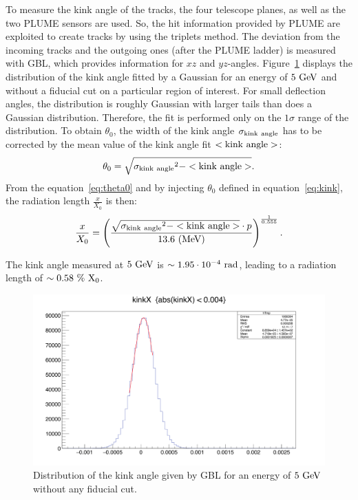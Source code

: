    To measure the kink angle of the tracks, the four telescope planes, as well as the two \gls{PLUME} sensors are used.
   So, the hit information provided by \gls{PLUME} are exploited to create tracks by using the triplets method.
   The deviation from the incoming tracks and the outgoing ones (after the \gls{PLUME} ladder) is measured with \gls{GBL}, which provides information for $xz$ and $yz$-angles.
   Figure~\ref{fig:kinkAngle5GeV} displays the distribution of the kink angle fitted by a Gaussian for an energy of $5~\rm{GeV}$ and without a fiducial cut on a particular region of interest.
   For small deflection angles, the distribution is roughly Gaussian with larger tails than does a Gaussian distribution\cite{Agashe:2014kda}.
   Therefore, the fit is performed only on the $1 \sigma$ range of the distribution.
   To obtain $\theta_0$, the width of the kink angle $\rm{\sigma_{kink~angle}}$ has to be corrected by the mean value of the kink angle fit $<\rm{kink~angle}>$:
   \begin{equation}
     \theta_0 = \sqrt{\rm{\sigma_{kink~angle}}^2 - <\rm{kink~angle}>}.
     \label{eq:kink}
   \end{equation}
   From the equation~\ref{eq:theta0} and by injecting $\theta_0$ defined in equation~\ref{eq:kink}, the radiation length $\frac{x}{X_0}$ is then:
   \begin{equation}
     \frac{x}{X_{0}} = \left( \frac{\sqrt{\rm{\sigma_{kink~angle}}^2 - <\rm{kink~angle}>} \cdot p}{13.6~\rm{(MeV)}} \right)^{\frac{1}{0.555}}.
   \end{equation}

   The kink angle measured at $5~\rm{GeV}$ is $\sim 1.95 \cdot 10^{-4}~\rm{rad}$, leading to a radiation length of $\sim 0.58~\%~\rm{X_0}$.
   
   \begin{figure}[!h]
     \centering
     \includegraphics[width = \textwidth]{Pictures/X0/kinkAngle5GeV_2.png}
     \caption{Distribution of the kink angle given by GBL for an energy of $5~\rm{GeV}$ without any fiducial cut.}
     \label{fig:kinkAngle5GeV}
   \end{figure} 

